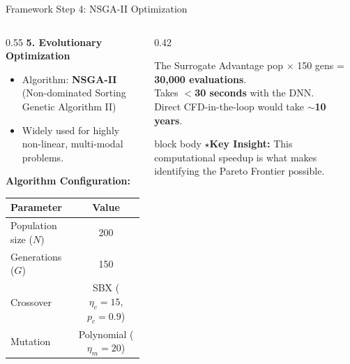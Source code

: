 \documentclass[10pt, aspectratio=169]{beamer}
\newcommand{\keyinsight}[1]{%
  \begin{beamercolorbox}[wd=\textwidth, sep=6pt, rounded=true]{block body}
    \textcolor{iitdNavy}{\textbf{\small$\star$\;Key Insight:}}\;
    {\small #1}
  \end{beamercolorbox}%
}
\begin{document}
\begin{frame}{Framework Step 4: NSGA-II Optimization}
    \begin{columns}[T]
        \begin{column}{0.55\textwidth}
            \textbf{5. Evolutionary Optimization}
            \begin{itemize}
                \item Algorithm: \textbf{NSGA-II} (Non-dominated Sorting Genetic Algorithm II)
                \item Widely used for highly non-linear, multi-modal problems.
            \end{itemize}

            \vspace{0.3em}
            \textbf{Algorithm Configuration:}
            \begin{table}
                \centering
                \small
                \begin{tabular}{@{}lc@{}}
                    \toprule
                    \textbf{Parameter} & \textbf{Value} \\
                    \midrule
                    Population size ($N$)  & 200 \\
                    Generations ($G$)      & 150 \\
                    Crossover & SBX ($\eta_c = 15$, $p_c = 0.9$) \\
                    Mutation  & Polynomial ($\eta_m = 20$) \\
                    \bottomrule
                \end{tabular}
            \end{table}
        \end{column}
        \begin{column}{0.42\textwidth}
            \vspace{1.5em}
            \begin{alertblock}{The Surrogate Advantage}
                 pop $\times$ 150 gens = \textbf{30,000 evaluations}.\\
                \vspace{0.5em}
                Takes \textbf{$<$30 seconds} with the DNN. \\
                \vspace{0.5em}
                Direct CFD-in-the-loop would take \textbf{$\sim$10 years}.
            \end{alertblock}
            
            \vspace{0.5em}
            \keyinsight{This computational speedup is what makes identifying the Pareto Frontier possible.}
        \end{column}
    \end{columns}
\end{frame}
\end{document}
